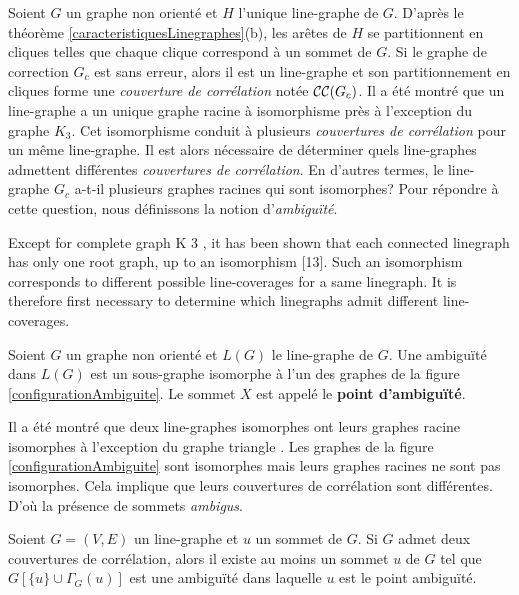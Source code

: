 Soient $G$ un graphe non orient\'e et $H$ l'unique  line-graphe de $G$.
D'apr\`es le th\'eor\`eme \ref{caracteristiquesLinegraphes}(b), les ar\^etes de $H$ se partitionnent en cliques telles que chaque clique correspond \`a un sommet de $G$. 
\newline
Si le graphe de correction $G_c$ est sans erreur, alors il est un line-graphe et son partitionnement en cliques forme une {\em couverture de corr\'elation} not\'ee ${\cal CC}(G_c)$. 
Il a \'et\'e montr\'e que un line-graphe a un unique graphe racine \`a isomorphisme pr\`es \cite{whitney1932congruent} \`a l'exception du graphe $K_3$.
Cet isomorphisme conduit \`a plusieurs {\em couvertures de corr\'elation} pour un m\^eme line-graphe. 
Il est alors n\'ecessaire de d\'eterminer quels line-graphes admettent diff\'erentes {\em couvertures de corr\'elation}. En d'autres termes, le line-graphe $G_c$ a-t-il plusieurs graphes racines qui sont isomorphes?
Pour r\'epondre \`a cette question, nous d\'efinissons la notion d'{\em ambigu\"{i}t\'e}. 
\newline

Except for complete graph K 3 , it has been shown that
each connected linegraph has only one root graph, up to an isomorphism [13]. Such an isomorphism
corresponds to different possible line-coverages for a same linegraph. It is therefore first necessary to
determine which linegraphs admit different line-coverages.

\begin{definition}
Soient $G$ un graphe non orient\'e et $L(G)$ le line-graphe de $G$. 
\newline
Une ambigu\"{i}t\'e dans $L(G)$ est un sous-graphe isomorphe \`a l'un des graphes de la figure \ref{configurationAmbiguite}. Le sommet $X$ est appel\'e le {\bf point d'ambigu\"{i}t\'e}.
\end{definition}

Il a \'et\'e montr\'e que deux line-graphes isomorphes ont leurs graphes racine isomorphes \`a l'exception du graphe triangle \cite{whitney1932congruent}. Les graphes de la figure \ref{configurationAmbiguite} sont isomorphes mais leurs graphes racines ne sont pas isomorphes. Cela implique que leurs couvertures de corr\'elation sont diff\'erentes. D'o\`u la pr\'esence de sommets {\em ambigus}.

\begin{lemma}
	Soient $G = (V,E)$ un line-graphe  et $u$ un sommet de $G$. 
	\newline
	Si $G$ admet deux couvertures de corr\'elation, alors il existe au moins un sommet $u$ de $G$ tel que $G[\{u\} \cup \Gamma_{G}(u)]$ est une ambigu\"{i}t\'e dans laquelle $u$ est le point ambigu\"{i}t\'e.
\end{lemma}
	

